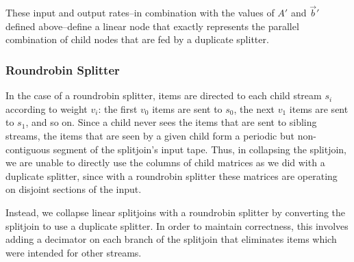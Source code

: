 These input and output rates--in combination with the values of $A'$
and ${\vec b}'$ defined above--define a linear node that exactly represents
the parallel combination of child nodes that are fed by a duplicate
splitter.

\subsubsection{Roundrobin Splitter}

In the case of a roundrobin splitter, items are directed to each child
stream $s_i$ according to weight $v_i$: the first $v_0$ items are sent
to $s_0$, the next $v_1$ items are sent to $s_1$, and so on.  Since a
child never sees the items that are sent to sibling streams, the items
that are seen by a given child form a periodic but non-contiguous
segment of the splitjoin's input tape.  Thus, in collapsing the
splitjoin, we are unable to directly use the columns of child matrices
as we did with a duplicate splitter, since with a roundrobin splitter
these matrices are operating on disjoint sections of the input.

Instead, we collapse linear splitjoins with a roundrobin splitter by
converting the splitjoin to use a duplicate splitter.  In order to
maintain correctness, this involves adding a decimator on each branch
of the splitjoin that eliminates items which were intended for other
streams.

